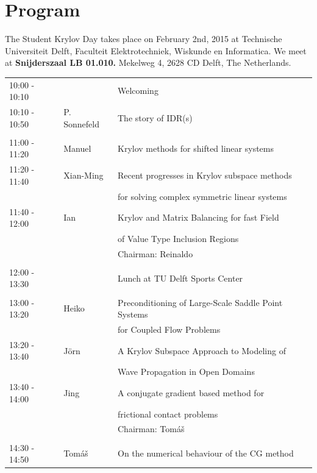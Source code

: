 \documentclass{article}
\begin{document}
\section*{Program}
The Student Krylov Day takes place on February 2nd, 2015 at Technische Universiteit Delft, 
    Faculteit Elektrotechniek, Wiskunde en Informatica. We meet at \textbf{Snijderszaal LB 01.010.}
Mekelweg 4, 2628 CD Delft, The Netherlands. \\ 
\begin{table}[h]
\begin{tabular}{lll}
10:00 - 10:10 &  & Welcoming \\ [0.5ex]
10:10 - 10:50 & P. Sonnefeld & The story of IDR(s) \\ [0.5ex]
\hline \\ [-1.5ex]
11:00 - 11:20 & Manuel & Krylov methods for shifted linear systems \\ [0.5ex]
11:20 - 11:40 & Xian-Ming & Recent progresses in Krylov subspace methods\\ 
                        & & for solving complex symmetric linear systems\\  [0.5ex]
11:40 - 12:00 & Ian & Krylov and Matrix Balancing for fast Field \\ 
              &     & of Value Type Inclusion Regions\\  [0.5ex]
& & \hfill \small{Chairman: Reinaldo }  \\
\hline \\ [-1.5ex]
12:00 - 13:30 & & Lunch at TU Delft Sports Center \\ [0.5ex]
\hline \\ [-1.5ex]
13:00 - 13:20 & Heiko & Preconditioning of Large-Scale Saddle Point Systems\\
                    & & for Coupled Flow Problems\\ [0.5ex]
13:20 - 13:40 &J\"orn & A Krylov Subspace Approach to Modeling of \\
                     & & Wave Propagation in Open Domains\\ [0.5ex]
13:40 - 14:00 & Jing & A conjugate gradient based method for \\
                   & & frictional contact problems\\ [0.5ex]
& & \hfill \small{Chairman: Tom{\'a}{\v s}} \\
\hline \\ [-1.5ex]
14:30 - 14:50 & Tom{\'a}{\v s} & On the numerical behaviour of the CG method\\ [0.5ex]

\end{tabular}
\end{table}
\end{document}
